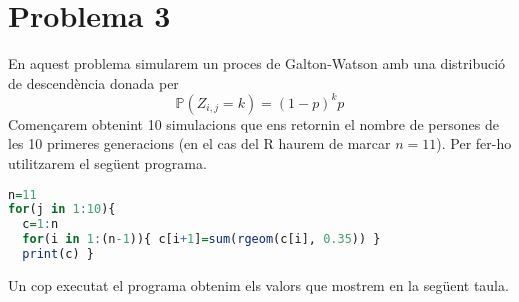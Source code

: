 \documentclass[11pt,a4paper]{article}
\begin{document}
\section*{Problema 3}
En aquest problema simularem un proces de Galton-Watson amb una distribució de descendència donada per
$$\mathbb{P}\left(Z_{i,j}=k\right)=\left(1-p\right)^kp$$
Començarem obtenint 10 simulacions que ens retornin el nombre de persones de les 10 primeres generacions (en el cas del R haurem de marcar $n=11$). Per fer-ho utilitzarem el següent programa.
\begin{center}
  \begin{lstlisting}[language=R, caption={Programa simulació 10 generacions},xleftmargin=.16\textwidth,xrightmargin=.16\textwidth]
n=11
for(j in 1:10){
  c=1:n
  for(i in 1:(n-1)){ c[i+1]=sum(rgeom(c[i], 0.35)) }
  print(c) }
\end{lstlisting}
\end{center}
Un cop executat el programa obtenim els valors que mostrem en la següent taula.
\end{document}
